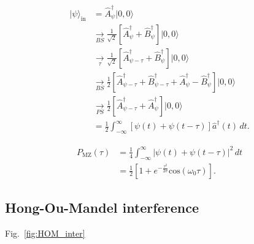 \documentclass[aps,rmp,twocolumn,amsmath,amssymb,nofootinbib,superscriptaddress,longbibliography,floatfix,table-of-contents,eqsecnum]{revtex4-1}
\newcommand{\ket}[1]{|#1\rangle}
\newcommand{\comment}[1]{{\color{blue}{\textbf{#1}}}}
\begin{document}
\begin{align}
	\ket\psi_\text{in} &= \hat{A}^\dag_\psi \ket{0,0} \nonumber \\
	&\underset{BS}{\to} \frac{1}{\sqrt{2}} [\hat{A}^\dag_\psi + \hat{B}^\dag_\psi] \ket{0,0} \nonumber \\
	&\underset{\tau}{\to} \frac{1}{\sqrt{2}} [\hat{A}^\dag_{\psi-\tau} + \hat{B}^\dag_\psi] \ket{0,0} \nonumber \\
	&\underset{BS}{\to} \frac{1}{2} [\hat{A}^\dag_{\psi-\tau} + \hat{B}^\dag_{\psi-\tau} + \hat{A}^\dag_\psi - \hat{B}^\dag_\psi] \ket{0,0} \nonumber \\
	&\underset{PS}{\to} \frac{1}{2} [\hat{A}^\dag_{\psi-\tau} + \hat{A}^\dag_\psi] \ket{0,0} \nonumber \\
	&= \frac{1}{2} \int_{-\infty}^\infty [\psi(t) + \psi(t-\tau)] \hat{a}^\dag(t)\,dt.
\end{align}

\begin{align}
P_\text{MZ}(\tau) &= \frac{1}{4} \int_{-\infty}^\infty |\psi(t) + \psi(t-\tau)|^2 \,dt \nonumber \\
&= \frac{1}{2} \left[ 1 + e^{-\frac{\tau^2}{2\sigma}}\text{cos}(\omega_0\tau) \right].
\end{align}


\comment{To do!}

%
%

\subsection{Hong-Ou-Mandel interference} 

Fig.~\ref{fig:HOM_inter}
\end{document}
